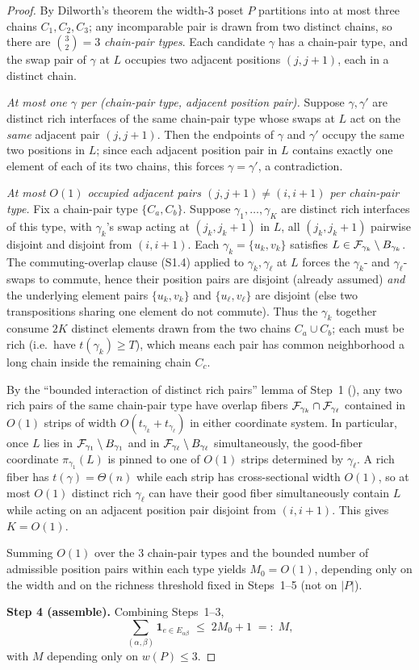 \begin{proof}
By Dilworth's theorem the width-3 poset $P$ partitions into at most
three chains $C_1,C_2,C_3$; any incomparable pair is drawn from two
distinct chains, so there are $\binom{3}{2}=3$ \emph{chain-pair
types}.  Each candidate $\gamma$ has a chain-pair type, and the swap
pair of $\gamma$ at $L$ occupies two adjacent positions $(j,j+1)$,
each in a distinct chain.

\emph{At most one $\gamma$ per (chain-pair type, adjacent position
pair).}  Suppose $\gamma,\gamma'$ are distinct rich interfaces of
the same chain-pair type whose swaps at $L$ act on the \emph{same}
adjacent pair $(j,j+1)$.  Then the endpoints of $\gamma$ and
$\gamma'$ occupy the same two positions in $L$; since each adjacent
position pair in $L$ contains exactly one element of each of its two
chains, this forces $\gamma=\gamma'$, a contradiction.

\emph{At most $O(1)$ occupied adjacent pairs $(j,j+1)\ne(i,i+1)$ per
chain-pair type.}  Fix a chain-pair type $\{C_a,C_b\}$.  Suppose
$\gamma_1,\ldots,\gamma_K$ are distinct rich interfaces of this
type, with $\gamma_k$'s swap acting at $(j_k,j_k+1)$ in $L$, all
$(j_k,j_k+1)$ pairwise disjoint and disjoint from $(i,i+1)$.  Each
$\gamma_k=\{u_k,v_k\}$ satisfies $L\in\mathcal{F}_{\gamma_k}\setminus
B_{\gamma_k}$.  The commuting-overlap clause (S1.4) applied to
$\gamma_k,\gamma_\ell$ at $L$ forces the $\gamma_k$- and
$\gamma_\ell$-swaps to commute, hence their position pairs are
disjoint (already assumed) \emph{and} the underlying element pairs
$\{u_k,v_k\}$ and $\{u_\ell,v_\ell\}$ are disjoint (else two
transpositions sharing one element do not commute).  Thus the
$\gamma_k$ together consume $2K$ distinct elements drawn from the
two chains $C_a\cup C_b$; each must be rich (i.e.\ have
$t(\gamma_k)\ge T$), which means each pair has common neighborhood
a long chain inside the remaining chain $C_c$.

By the ``bounded interaction of distinct rich pairs'' lemma of
Step~1 (), any two rich pairs of the same
chain-pair type have overlap fibers $\mathcal{F}_{\gamma_k}\cap
\mathcal{F}_{\gamma_\ell}$ contained in $O(1)$ strips of width
$O(t_{\gamma_k}+t_{\gamma_\ell})$ in either coordinate system.
In particular, once $L$ lies in $\mathcal{F}_{\gamma_1}\setminus
B_{\gamma_1}$ and in $\mathcal{F}_{\gamma_\ell}\setminus B_{\gamma_\ell}$
simultaneously, the good-fiber coordinate $\pi_{\gamma_1}(L)$ is
pinned to one of $O(1)$ strips determined by $\gamma_\ell$.
A rich fiber has $t(\gamma)=\Theta(n)$ while each strip has
cross-sectional width $O(1)$, so at most $O(1)$ distinct rich
$\gamma_\ell$ can have their good fiber simultaneously contain $L$
while acting on an adjacent position pair disjoint from
$(i,i+1)$.  This gives $K=O(1)$.

Summing $O(1)$ over the $3$ chain-pair types and the bounded
number of admissible position pairs within each type yields
$M_0=O(1)$, depending only on the width and on the richness
threshold fixed in Steps~1--5 (not on $|P|$).

\smallskip\noindent\textbf{Step 4 (assemble).}
Combining Steps~1--3,
\[
\sum_{(\alpha,\beta)}\mathbf 1_{e\in E_{\alpha\beta}}
  \;\le\; 2M_0+1 \;=:\; M,
\]
with $M$ depending only on $w(P)\le 3$.
\end{proof}

